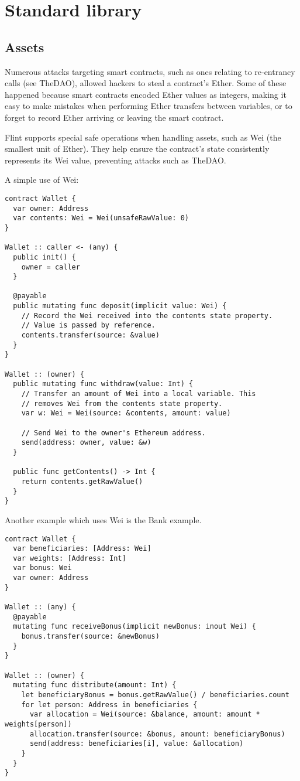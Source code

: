 \section{Standard library}
\label{sec:appendix-b-standard-library}

\subsection{Assets}
\label{sec:appendix-b-assets}

Numerous attacks targeting smart contracts, such as ones relating to re-entrancy calls (see TheDAO), allowed hackers to steal a contract’s Ether. Some of these happened because smart contracts encoded Ether values as integers, making it easy to make mistakes when performing Ether transfers between variables, or to forget to record Ether arriving or leaving the smart contract.

Flint supports special safe operations when handling assets, such as Wei (the smallest unit of Ether). They help ensure the contract's state consistently represents its Wei value, preventing attacks such as TheDAO.

A simple use of Wei:

\begin{verbatim}
contract Wallet {
  var owner: Address
  var contents: Wei = Wei(unsafeRawValue: 0)
}

Wallet :: caller <- (any) {
  public init() {
    owner = caller
  }

  @payable
  public mutating func deposit(implicit value: Wei) {
    // Record the Wei received into the contents state property.
    // Value is passed by reference.
    contents.transfer(source: &value)
  }
}

Wallet :: (owner) {
  public mutating func withdraw(value: Int) {
    // Transfer an amount of Wei into a local variable. This
    // removes Wei from the contents state property.
    var w: Wei = Wei(source: &contents, amount: value)

    // Send Wei to the owner's Ethereum address.
    send(address: owner, value: &w)
  }

  public func getContents() -> Int {
    return contents.getRawValue()
  }
}
\end{verbatim}

Another example which uses Wei is the Bank example.

\begin{verbatim}
contract Wallet {
  var beneficiaries: [Address: Wei]
  var weights: [Address: Int]
  var bonus: Wei
  var owner: Address
}

Wallet :: (any) {
  @payable
  mutating func receiveBonus(implicit newBonus: inout Wei) {
    bonus.transfer(source: &newBonus)
  }
}

Wallet :: (owner) {
  mutating func distribute(amount: Int) {
    let beneficiaryBonus = bonus.getRawValue() / beneficiaries.count
    for let person: Address in beneficiaries {
      var allocation = Wei(source: &balance, amount: amount * weights[person])
      allocation.transfer(source: &bonus, amount: beneficiaryBonus)
      send(address: beneficiaries[i], value: &allocation)
    }
  }
}
\end{verbatim}

